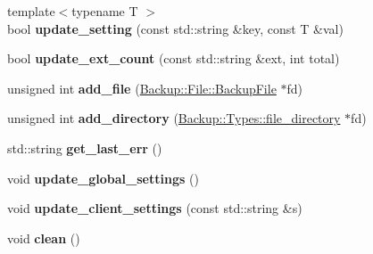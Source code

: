 \begin{DoxyCompactItemize}
\item 
\mbox{\label{class_backup_1_1_database_1_1_local_database_a7c6ac52eeb64f451d746ff3b3d3e3d3f}} 
{\footnotesize template$<$typename T $>$ }\\bool {\bfseries update\+\_\+setting} (const std\+::string \&key, const T \&val)
\item 
\mbox{\label{class_backup_1_1_database_1_1_local_database_a18737407d07d0df8fd904061f139102b}} 
bool {\bfseries update\+\_\+ext\+\_\+count} (const std\+::string \&ext, int total)
\item 
\mbox{\label{class_backup_1_1_database_1_1_local_database_aeb27a45a2b956a5aa0f8ede9212ccc1c}} 
unsigned int {\bfseries add\+\_\+file} (\hyperlink{class_backup_1_1_file_1_1_backup_file}{Backup\+::\+File\+::\+Backup\+File} $\ast$fd)
\item 
\mbox{\label{class_backup_1_1_database_1_1_local_database_a3a03112d18428b1135a35c1b93aa6f50}} 
unsigned int {\bfseries add\+\_\+directory} (\hyperlink{struct_backup_1_1_types_1_1file__directory}{Backup\+::\+Types\+::file\+\_\+directory} $\ast$fd)
\item 
\mbox{\label{class_backup_1_1_database_1_1_local_database_aaf894e6e5b748b0c42701353f3741d0b}} 
std\+::string {\bfseries get\+\_\+last\+\_\+err} ()
\item 
\mbox{\label{class_backup_1_1_database_1_1_local_database_a1e3b91a1b4a4b3d54ff53ba82600abd3}} 
void {\bfseries update\+\_\+global\+\_\+settings} ()
\item 
\mbox{\label{class_backup_1_1_database_1_1_local_database_a27f71da48a1c85deda8b4651b3cc4eae}} 
void {\bfseries update\+\_\+client\+\_\+settings} (const std\+::string \&s)
\item 
\mbox{\label{class_backup_1_1_database_1_1_local_database_a825296e65a28032e2ece0661c7d430a9}} 
void {\bfseries clean} ()
\end{DoxyCompactItemize}
